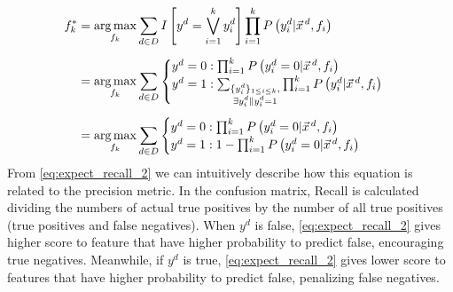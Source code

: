 \begin{align}
f_k^*&=\argmax_{f_k}\sum_{d\in D}I\left[y^d=\bigvee_{i=1}^k y^d_i\right]\prod_{i=1}^kP\left(y_i^d|\vec{x}^{\,d},f_i\right)\nonumber\\[0.5em]
&=\argmax_{f_k}\sum_{d\in D}
\begin{cases}
	y^d=0: \prod_{i=1}^kP\left(y_i^d=0|\vec{x}^{\,d},f_i\right)\\
	y^d=1: \sum_{\substack{\{y_i^d\}_{1\leq i\leq k},\\ \exists{y_i^d\|y_i^d=1}}}\prod_{i=1}^kP\left(y_i^d|\vec{x}^{\,d},f_i\right)
\end{cases}\nonumber\\[0.5em]
&=\argmax_{f_k}\sum_{d\in D}
\begin{cases}
	y^d=0: \prod_{i=1}^kP\left(y_i^d=0|\vec{x}^{\,d},f_i\right)\\
	y^d=1: 1-\prod_{i=1}^kP\left(y_i^d=0|\vec{x}^{\,d},f_i\right)
\end{cases}\label{eq:expect_recall_2}%
\end{align}
From \eqref{eq:expect_recall_2} we can intuitively describe how this
equation is related to the precision metric. In the confusion matrix,
Recall is calculated dividing the numbers of actual true positives by
the number of all true positives (true positives and false
negatives). When $y^d$ is false, \eqref{eq:expect_recall_2} gives
higher score to feature that have higher probability to predict false,
encouraging true negatives. Meanwhile, if $y^d$ is true,
\eqref{eq:expect_recall_2} gives lower score to features that have
higher probability to predict false, penalizing false negatives.

